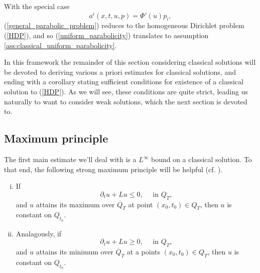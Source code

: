 \documentclass[11pt, a4paper]{article}
\begin{document}
With the special case
\begin{equation*}
a^i(x,t,u,p) = \Phi'(u)p_i,
\end{equation*}
(\ref{general_parabolic_problem}) reduces to the homogeneous Dirichlet problem (\ref{HDP}),
and so (\ref{uniform_parabolicity}) translates to assumption \ref{ass:classical_uniform_parabolicity}.

In this framework the remainder of this section considering classical solutions will be devoted to deriving various a priori estimates for classical solutions, and ending with a corollary stating sufficient conditions for existence of a classical solution to (\ref{HDP}). As we will see, these conditions are quite strict, leading us naturally to want to consider weak solutions, which the next section is devoted to.
\subsection{Maximum principle}
The first main estimate we'll deal with is a $L^\infty$ bound on a classical solution. To that end, the following strong maximum principle will be helpful (cf. \citep[p. 396]{evans}).

\begin{theorem}
\begin{enumerate}[i)]
	Suppose $\Omega$ is connected, and $u\in C^{2,1}(Q_T)\cap C(\overline{Q}_T)$, and $\partial_t + L$ is uniformly parabolic, then:
	\item If
	\begin{equation*}
		\partial_tu + Lu \leq 0, \quad \text{ in } Q_T, 
	\end{equation*}
	and $u$ attains its maximum over $\overline{Q}_T$ at point $(x_0,t_0)\in Q_T$, then
	$u$ is constant on $Q_{t_0}$.
	
	\item Analagously, if
	\begin{equation*}
		\partial_tu + Lu \geq 0, \quad \text{ in } Q_T, 
	\end{equation*}
	and $u$ attains its minimum over $\overline{Q}_T$ at a points  $(x_0,t_0) \in Q_T$, then $u$ is constant on $Q_{t_0}$.
\end{enumerate}
\end{theorem}
\end{document}
